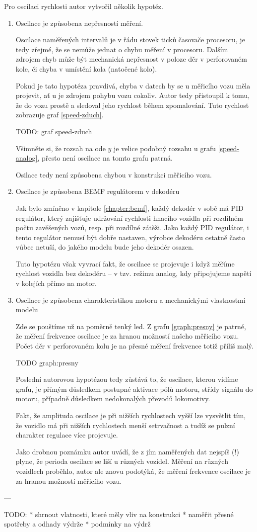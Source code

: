 Pro oscilaci rychlosti autor vytvořil několik hypotéz.

\begin{enumerate}
\item Oscilace je způsobena nepřesností měření.

Oscilace naměřených intervalů je v řádu stovek ticků časovače procesoru, je tedy
zřejmé, že se nemůže jednat o chybu měření v procesoru. Dalším zdrojem chyb
může být mechanická nepřesnost v poloze děr v perforovaném kole, či chyba v
umístění kola (natočené kolo).

Pokud je tato hypotéza pravdivá, chyba v datech by se u měřicího vozu měla
projevit, ať u je zdrojem pohybu vozu cokoliv. Autor tedy přistoupil k tomu,
že do vozu prostě  a sledoval jeho rychlost během zpomalování.
Tuto rychlost zobrazuje graf \ref{speed-zduch}.

TODO: graf speed-zduch

Všimněte si, že rozsah na ode $y$ je velice podobný rozsahu u grafu
\ref{speed-analog}, přesto není oscilace na tomto grafu patrná.

Osilace tedy není způsobena chybou v konstrukci měřicího vozu.

\item Oscilace je způsobena BEMF regulátorem v dekodéru

Jak bylo zmíněno v kapitole \ref{chapter:bemf}, každý dekodér v sobě má PID
regulátor, který zajišťuje udržování rychlosti hnacího vozidla při rozdílném
počtu zavěšených vozů, resp. při rozdílné zátěži. Jako každý PID regulátor,
i tento regulátor nemusí být dobře nastaven, výrobce dekodéru ostatně často
vůbec netuší, do jakého modelu bude jeho dekodér osazen.

Tuto hypotézu však vyvrací fakt, že oscilace se projevuje i když měříme rychlost
vozidla bez dekodéru -- v tzv. režimu analog, kdy připojujeme napětí v kolejích
přímo na motor.

\item Oscilace je způsobena charakteristikou motoru a mechanickými vlastnostmi
modelu

Zde se pouštíme už na poměrně tenký led. Z grafu \ref{graph:presny} je patrné,
že měření frekvence oscilace je za hranou možností našeho měřicího vozu. Počet
děr v perforovaném kolu je na přesné měření frekvence totiž příliš malý.

TODO graph:presny

Poslední autorovou hypotézou tedy zůstává to, že oscilace, kterou vidíme grafu,
je přímým důsledkem postupné aktivace pólů motoru, střídy signálu do motoru,
případně důsledkem nedokonalých převodů lokomotivy.

Fakt, že amplituda oscilace je při nižších rychlostech vyšší lze vysvětlit tím,
že vozidlo má při nižších rychlostech menší setrvačnost a tudíž se pulzní
charakter regulace více projevuje.

Jako drobnou poznámku autor uvádí, že z jím naměřených dat nejspíš (!) plyne,
že perioda oscilace se liší u různých vozidel. Měření na různých vozidlech
proběhlo, autor ale znovu podotýká, že měření frekvence oscilace je za hranou
možností měřicího vozu.

\end{enumerate}

---

TODO:
 * shrnout vlatnosti, které měly vliv na konstrukci
 * naměřit přesné spotřeby a odhady výdrže
 * podmínky na výdrž
